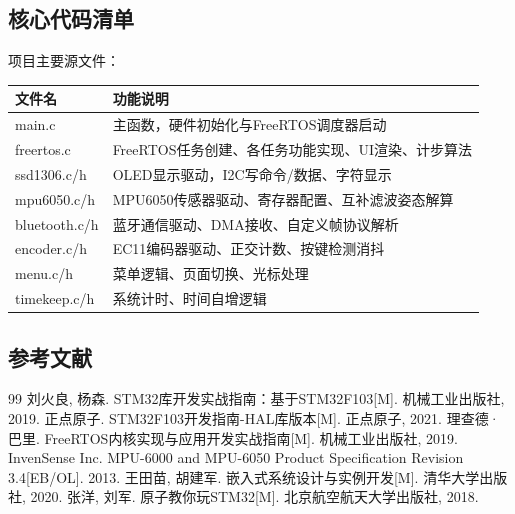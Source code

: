 \documentclass[12pt, a4paper]{ctexart}
\begin{document}
\subsection{核心代码清单}
项目主要源文件：
\begin{table}[htbp]
\centering
\begin{tabular}{ll}
\toprule
文件名 & 功能说明 \\
\midrule
main.c & 主函数，硬件初始化与FreeRTOS调度器启动 \\
freertos.c & FreeRTOS任务创建、各任务功能实现、UI渲染、计步算法 \\
ssd1306.c/h & OLED显示驱动，I2C写命令/数据、字符显示 \\
mpu6050.c/h & MPU6050传感器驱动、寄存器配置、互补滤波姿态解算 \\
bluetooth.c/h & 蓝牙通信驱动、DMA接收、自定义帧协议解析 \\
encoder.c/h & EC11编码器驱动、正交计数、按键检测消抖 \\
menu.c/h & 菜单逻辑、页面切换、光标处理 \\
timekeep.c/h & 系统计时、时间自增逻辑 \\
\bottomrule
\end{tabular}
\end{table}

\subsection{参考文献}
\begin{thebibliography}{99}
 刘火良, 杨森. STM32库开发实战指南：基于STM32F103[M]. 机械工业出版社, 2019.
 正点原子. STM32F103开发指南-HAL库版本[M]. 正点原子, 2021.
 理查德·巴里. FreeRTOS内核实现与应用开发实战指南[M]. 机械工业出版社, 2019.
 InvenSense Inc. MPU-6000 and MPU-6050 Product Specification Revision 3.4[EB/OL]. 2013.
 王田苗, 胡建军. 嵌入式系统设计与实例开发[M]. 清华大学出版社, 2020.
 张洋, 刘军. 原子教你玩STM32[M]. 北京航空航天大学出版社, 2018.
\end{thebibliography}
\end{document}
